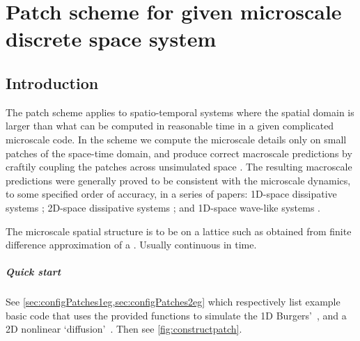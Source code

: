 \chapter{Patch scheme for given microscale discrete space system}
\label{sec:patch}
\localtableofcontents

\section{Introduction}


The patch scheme applies to spatio-temporal systems where
the spatial domain is larger than what can be computed in
reasonable time in a given complicated microscale code.  In
the scheme we compute the microscale details only on small
patches of the space-time domain, and produce correct
macroscale predictions by craftily coupling the patches
across unsimulated space \cite[e.g.]{Hyman2005, Samaey03b,
Samaey04, Roberts06d, Liu2015}.  The resulting macroscale
predictions were generally proved to be consistent with the
microscale dynamics, to some specified order of accuracy, in
a series of papers: 1D-space dissipative systems
\cite[]{Roberts06d, Bunder2013b}; 2D-space dissipative
systems \cite[]{Roberts2011a}; and 1D-space wave-like
systems \cite[]{Cao2014a}.

The microscale spatial structure is to be on a lattice such
as obtained from finite difference approximation of a \pde.
Usually continuous in time.

\paragraph{Quick start}
See \cref{sec:configPatches1eg,sec:configPatches2eg} which
respectively list example basic code that uses the provided 
functions to simulate the 1D Burgers'~\pde, and a 2D 
nonlinear `diffusion'~\pde.  Then see \cref{fig:constructpatch}.

